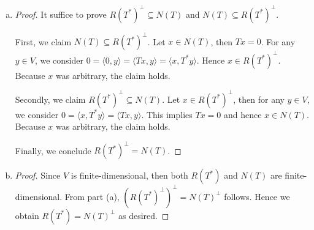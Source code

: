 \begin{Exercise}
	\begin{enumerate}[(a)]
		\item
		\begin{proof}
			It suffice to prove $R(T^*)^{\perp} \subseteq N(T)$ and $N(T) \subseteq R(T^*)^{\perp}$.
			
			First, we claim $N(T) \subseteq R(T^*)^{\perp}$. Let $x\in N(T)$, then $T x = 0$. For any $y\in V$, we consider $
			0 = \langle 0, y \rangle = \langle T x , y \rangle = \langle x, T^* y \rangle$. Hence $x\in R(T^*)^{\perp}$. Because $x$ was arbitrary, the claim holds.
			
			Secondly, we claim $R(T^*)^{\perp} \subseteq N(T)$. Let $x\in R(T^*)^{\perp}$, then for any $y\in V$, we consider $0 = \langle x, T^* y \rangle = \langle T x, y \rangle$. This implies $T x = 0$ and hence $x\in N(T)$. Because $x$ was arbitrary, the claim holds.
			
			Finally, we conclude $R(T^*)^{\perp} = N(T)$.
		\end{proof}
		
		\item
		\begin{proof}
			Since $V$ is finite-dimensional, then both $R(T^*)$ and $N(T)$ are finite-dimensional. From part (a), $(R(T^*)^{\perp})^{\perp} = N(T)^{\perp}$ follows. Hence we obtain $R(T^*) = N(T)^{\perp}$ as desired.
		\end{proof}
	\end{enumerate}
\end{Exercise}